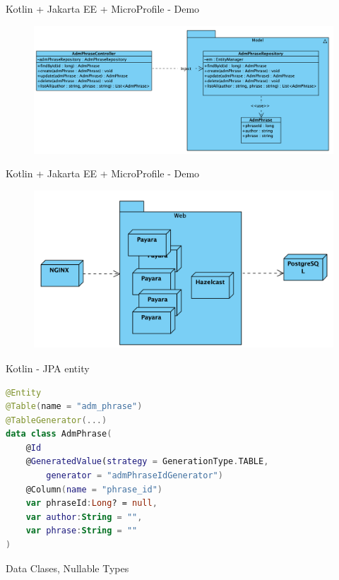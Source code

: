 \documentclass[aspectratio=169]{beamer}
\begin{document}
\begin{frame}{Kotlin + Jakarta EE + MicroProfile  - Demo}
\begin{figure}
	\centering
	\includegraphics[width=\linewidth]{Images/integrum-ee}
\end{figure}
\end{frame}

\begin{frame}{Kotlin + Jakarta EE + MicroProfile  - Demo}
\begin{figure}
	\centering
	\includegraphics[width=\linewidth]{Images/integrum-deployment}
\end{figure}
\end{frame}


\begin{frame}[fragile]{Kotlin - JPA entity}
\begin{lstlisting}[language=Kotlin]
@Entity
@Table(name = "adm_phrase")
@TableGenerator(...)
data class AdmPhrase(
    @Id
    @GeneratedValue(strategy = GenerationType.TABLE,
        generator = "admPhraseIdGenerator")
    @Column(name = "phrase_id")
    var phraseId:Long? = null,
    var author:String = "",
    var phrase:String = ""
)
\end{lstlisting}
Data Clases, Nullable Types
\end{frame}
\end{document}
